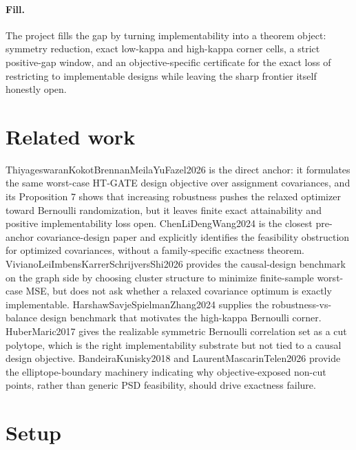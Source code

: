 \documentclass{article}
\begin{document}
\paragraph{Fill.} The project fills the gap by turning implementability into a theorem object: symmetry reduction, exact low-kappa and high-kappa corner cells, a strict positive-gap window, and an objective-specific certificate for the exact loss of restricting to implementable designs while leaving the sharp frontier itself honestly open.

\section{Related work}

ThiyageswaranKokotBrennanMeilaYuFazel2026 is the direct anchor: it formulates the same worst-case HT-GATE design objective over assignment covariances, and its Proposition 7 shows that increasing robustness pushes the relaxed optimizer toward Bernoulli randomization, but it leaves finite exact attainability and positive implementability loss open. ChenLiDengWang2024 is the closest pre-anchor covariance-design paper and explicitly identifies the feasibility obstruction for optimized covariances, without a family-specific exactness theorem. VivianoLeiImbensKarrerSchrijversShi2026 provides the causal-design benchmark on the graph side by choosing cluster structure to minimize finite-sample worst-case MSE, but does not ask whether a relaxed covariance optimum is exactly implementable. HarshawSavjeSpielmanZhang2024 supplies the robustness-vs-balance design benchmark that motivates the high-kappa Bernoulli corner. HuberMaric2017 gives the realizable symmetric Bernoulli correlation set as a cut polytope, which is the right implementability substrate but not tied to a causal design objective. BandeiraKunisky2018 and LaurentMascarinTelen2026 provide the elliptope-boundary machinery indicating why objective-exposed non-cut points, rather than generic PSD feasibility, should drive exactness failure.

\section{Setup}
\end{document}

